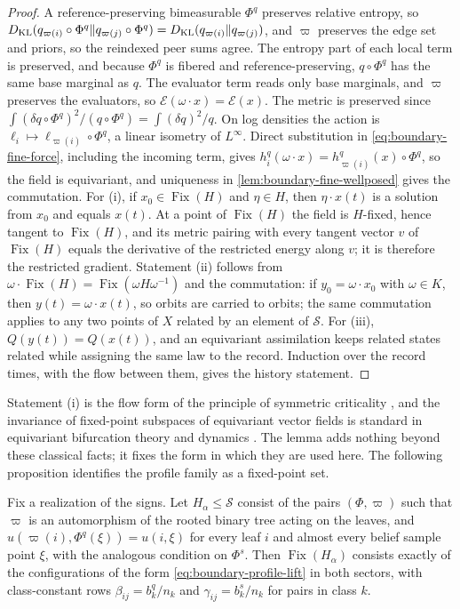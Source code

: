 \begin{proof}
A reference-preserving bimeasurable $\Phi^q$ preserves relative entropy, so $D_{\mathrm{KL}}(q_{\varpi(i)}\circ\Phi^q\Vert q_{\varpi(j)}\circ\Phi^q)=D_{\mathrm{KL}}(q_{\varpi(i)}\Vert q_{\varpi(j)})$, and $\varpi$ preserves the edge set and priors, so the reindexed peer sums agree. The entropy part of each local term is preserved, and because $\Phi^q$ is fibered and reference-preserving, $q\circ\Phi^q$ has the same base marginal as $q$. The evaluator term reads only base marginals, and $\varpi$ preserves the evaluators, so $\mathcal E(\omega\cdot x)=\mathcal E(x)$. The metric is preserved since $\int(\delta q\circ\Phi^q)^2/(q\circ\Phi^q)=\int(\delta q)^2/q$. On log densities the action is $\ell_i\mapsto\ell_{\varpi(i)}\circ\Phi^q$, a linear isometry of $L^\infty$. Direct substitution in \cref{eq:boundary-fine-force}, including the incoming term, gives $h_i^q(\omega\cdot x)=h_{\varpi(i)}^q(x)\circ\Phi^q$, so the field is equivariant, and uniqueness in \cref{lem:boundary-fine-wellposed} gives the commutation. For (i), if $x_0\in\operatorname{Fix}(H)$ and $\eta\in H$, then $\eta\cdot x(t)$ is a solution from $x_0$ and equals $x(t)$. At a point of $\operatorname{Fix}(H)$ the field is $H$-fixed, hence tangent to $\operatorname{Fix}(H)$, and its metric pairing with every tangent vector $v$ of $\operatorname{Fix}(H)$ equals the derivative of the restricted energy along $v$; it is therefore the restricted gradient. Statement (ii) follows from $\omega\cdot\operatorname{Fix}(H)=\operatorname{Fix}(\omega H\omega^{-1})$ and the commutation: if $y_0=\omega\cdot x_0$ with $\omega\in K$, then $y(t)=\omega\cdot x(t)$, so orbits are carried to orbits; the same commutation applies to any two points of $X$ related by an element of $\mathcal S$. For (iii), $Q(y(t))=Q(x(t))$, and an equivariant assimilation keeps related states related while assigning the same law to the record. Induction over the record times, with the flow between them, gives the history statement.
\end{proof}

Statement (i) is the flow form of the principle of symmetric criticality \citep{Palais1979}, and the invariance of fixed-point subspaces of equivariant vector fields is standard in equivariant bifurcation theory and dynamics \citep{GolubitskyStewartSchaeffer1988,Field2007}. The lemma adds nothing beyond these classical facts; it fixes the form in which they are used here. The following proposition identifies the profile family as a fixed-point set.

Fix a realization of the signs. Let $H_\alpha\le\mathcal S$ consist of the pairs $(\Phi,\varpi)$ such that $\varpi$ is an automorphism of the rooted binary tree acting on the leaves, and $u(\varpi(i),\Phi^q(\xi))=u(i,\xi)$ for every leaf $i$ and almost every belief sample point $\xi$, with the analogous condition on $\Phi^s$. Then $\operatorname{Fix}(H_\alpha)$ consists exactly of the configurations of the form \cref{eq:boundary-profile-lift} in both sectors, with class-constant rows $\beta_{ij}=b_k^q/n_k$ and $\gamma_{ij}=b_k^s/n_k$ for pairs in class $k$.

